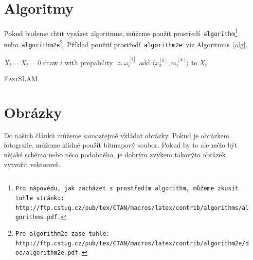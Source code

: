 \documentclass[a4paper,11pt]{article}[20-03-2022]
\begin{document}
\section{Algoritmy}
\label{sec3}
Pokud budeme chtít vysázet algoritmus, můžeme použít prostředí\texttt{ algorithm\footnote{Pro nápovědu, jak zacházet s prostředím\texttt{ algorithm,} můžeme zkusit tuhle stránku:\\http://ftp.cstug.cz/pub/tex/CTAN/macros/latex/contrib/algorithms/algorithms.pdf.} }nebo\texttt{ algorithm2e\footnote{Pro\texttt{ algorithm2e }zase tuhle: http://ftp.cstug.cz/pub/tex/CTAN/macros/latex/contrib/algorithm2e/doc/algorithm2e.pdf.}}. 
Příklad použití prostředí\texttt{ algorithm2e }viz Algoritmus~\ref{alg}.
\bigskip
\begin{algorithm}
    \label{alg}
    \DontPrintSemicolon
    $\overline{X_t} = X_t = 0$\;
     {
        draw $i$ with propability $\approx \omega_t^[i]$\;
        add $\langle x_x^{[k]}, m_t^{[k]} \rangle$ to $X_t$\;
    }
    \caption{\textsc{FastSLAM}}
\end{algorithm}

\section{Obrázky}
Do našich článků můžeme samozřejmě vkládat obrázky. Pokud je obrázkem fotografie, můžeme klidně použít bitmapový soubor. 
Pokud by to ale mělo být nějaké schéma nebo něco podobného, je dobrým zvykem takovýto obrázek vytvořit vektorově.
\end{document}

